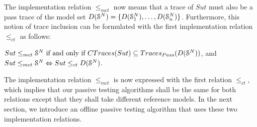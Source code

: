 The implementation relation $\leq_{mct}$ now means that a trace
of $\mathit{Sut}$ must also be a pass trace of the model set
$D(\EuScript{S}^{N})=\{D(\EuScript{S}_1^{N}),\dots,D(\EuScript{S}_n^{N})\}$.
Furthermore, this notion of trace inclusion can be formulated
with the first implementation relation $\leq_{ct}$ as follows:

\begin{proposition}
    ${Sut} \leq_{mct} \EuScript{S}^{N} \text{ if and only if }
    CTraces({Sut})\subseteq
    Traces_{Pass}(D(\EuScript{S}^{N}))$, and ${Sut} \leq_{mct}
    \EuScript{S}^{N} \Leftrightarrow {Sut} \leq_{ct}
    D(\EuScript{S}^{N})$.

    \label{rel:impl2}
\end{proposition}

The implementation relation $\leq_{mct}$ is now expressed with
the first relation $\leq_{ct}$, which implies that our passive
testing algorithms shall be the same for both relations except
that they shall take different reference models. In the next
section, we introduce an offline passive testing algorithm that
uses these two implementation relations.
